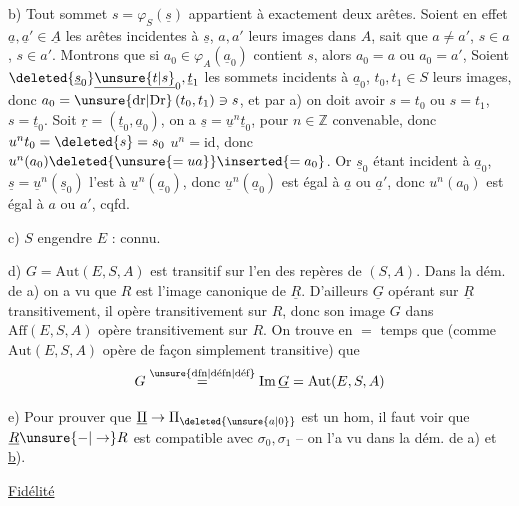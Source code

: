 b) Tout sommet $s=\varphi_S(\underline{s})$ appartient à
exactement deux arêtes. Soient en effet
$\underline a,\underline a'\in\underline A$ les arêtes incidentes à $\underline s$, $a,a'$
leurs images dans $A$,  sait que $a\ne a'$,
$s\in a$, $s\in a'$. Montrons que si $a_0\in\varphi_A(\underline a_0)$
 contient $s$, alors $a_0=a$ ou $a_0=a'$,
 Soient $\deleted{\underline s_0}\underline{\unsure{t|s}}_0,\underline t_1$ les sommets incidents
à $\underline a_0$,  $t_0,t_1\in S$ leurs images, donc
  $a_0=\text{\unsure{dr|Dr}}\,(t_0,t_1)\ni s$, et par a) on
doit avoir  $s=t_0$ ou $s=t_1$, 
 $s=\underline t_0$. Soit $\underline r=(\underline t_0,\underline a_0)$,
on a $\underline s=\underline u^{n}\underline t_0$, pour $n\in\mathbb Z$ convenable,
donc $u^nt_0=\deleted{s}=s_0$  $u^n=\mathrm{id}$, donc
 $u^n(a_0)\deleted{\unsure{=ua}} \inserted{=a_0}$. Or $\underline{s}_0$ étant incident
à $\underline a_0$, $\underline s=\underline u^n(\underline s_0)$ l'est à $\underline u^n(\underline a_0)$, donc
$\underline u^n(\underline a_0)$  est égal à $\underline a$ ou $\underline a'$, donc
$u^n(a_0)$  est égal à $a$ ou $a'$,  cqfd.

c)  $S$ engendre $E$ : connu.

d) $G=\mathrm{Aut}(E,S,A)$ est transitif sur
l'en des repères de $(S,A)$. Dans
la dém. de a)  on a vu que $R$ est
l'image canonique de $\underline R$. D'ailleurs
$\underline G$ opérant sur $\underline R$ transitivement,
il opère transitivement sur $R$, donc
son image $G$ dans $\mathrm{Aff}(E,S,A)$ opère transitivement
sur $R$. On trouve en $=$
temps que (comme $\mathrm{Aut}(E,S,A)$ opère de
façon simplement transitive) que
\[
G\overset{\text{\unsure{dfn|défn|déf}}}{=}\mathrm{Im}\,\underline G=\mathrm{Aut}(E,S,A)
\]

e) Pour prouver que $\underline\Pi\to\Pi_{\deleted{\unsure{a|0}}}$ est
un hom, il faut voir que $\underline R\unsure{-|\to}R$
est compatible avec $\sigma_0,\sigma_1$ -- on l'a
vu dans la dém. de a) et \uline{b}).
\begin{center}\uline{Fidélité}\end{center}

